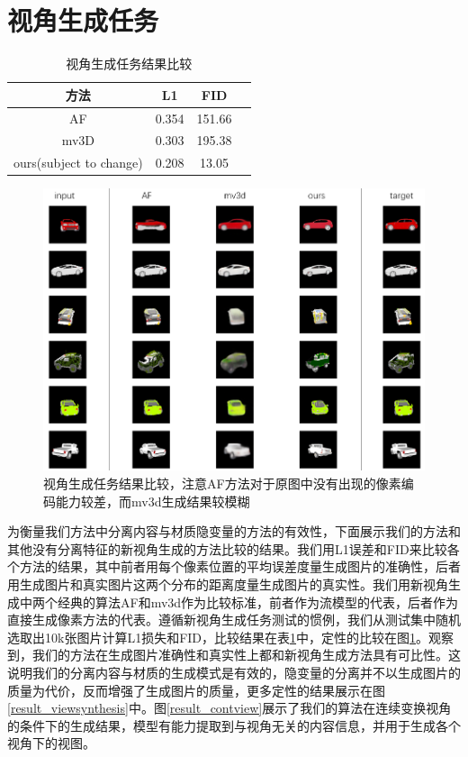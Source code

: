 \documentclass[UTF8,openany,AutoFakeBold,AutoFakeSlant,cs4size]{ctexbook}
\begin{document}
\section{视角生成任务}

\begin{table}[h]
\small %
\centering
\caption{视角生成任务结果比较}
\label{novel_view_thesis}
\begin{tabular}{cccc} %
\toprule %
方法 & L1 & FID \\
\midrule
AF\cite{Zhou2016ViewSB} & 0.354 & 151.66 \\
mv3D\cite{Su2015MultiviewCN} & 0.303 & 195.38 \\
ours(subject to change) & 0.208 & 13.05 \\
\bottomrule
\end{tabular}
\end{table}

\begin{figure}
\centering
\includegraphics[width=\linewidth]{./images/compare_methods.png}
\caption{视角生成任务结果比较，注意AF方法对于原图中没有出现的像素编码能力较差，而mv3d生成结果较模糊}
\label{compare_methods}
\end{figure}

为衡量我们方法中分离内容与材质隐变量的方法的有效性，下面展示我们的方法和其他没有分离特征的新视角生成的方法比较的结果。我们用L1误差和FID来比较各个方法的结果，其中前者用每个像素位置的平均误差度量生成图片的准确性，后者用生成图片和真实图片这两个分布的距离度量生成图片的真实性。我们用新视角生成中两个经典的算法AF\cite{Zhou2016ViewSB}和mv3d\cite{TDB16a}作为比较标准，前者作为流模型的代表，后者作为直接生成像素方法的代表。遵循新视角生成任务测试的惯例，我们从测试集中随机选取出10k张图片计算L1损失和FID，比较结果在表\ref{novel_view_thesis}中，定性的比较在图\ref{compare_methods}。观察到，我们的方法在生成图片准确性和真实性上都和新视角生成方法具有可比性。这说明我们的分离内容与材质的生成模式是有效的，隐变量的分离并不以生成图片的质量为代价，反而增强了生成图片的质量，更多定性的结果展示在图\ref{result_viewsynthesis}中。图\ref{result_contview}展示了我们的算法在连续变换视角的条件下的生成结果，模型有能力提取到与视角无关的内容信息，并用于生成各个视角下的视图。
\end{document}
